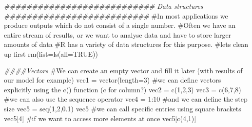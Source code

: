 \documentclass[
  letterpaper,
  DIV=11,
  numbers=noendperiod]{scrreprt}
\newenvironment{Shaded}{\begin{snugshade}}{\end{snugshade}}
\newcommand{\AttributeTok}[1]{\textcolor[rgb]{0.40,0.45,0.13}{#1}}
\newcommand{\CommentTok}[1]{\textcolor[rgb]{0.37,0.37,0.37}{#1}}
\newcommand{\ConstantTok}[1]{\textcolor[rgb]{0.56,0.35,0.01}{#1}}
\newcommand{\DecValTok}[1]{\textcolor[rgb]{0.68,0.00,0.00}{#1}}
\newcommand{\DocumentationTok}[1]{\textcolor[rgb]{0.37,0.37,0.37}{\textit{#1}}}
\newcommand{\FloatTok}[1]{\textcolor[rgb]{0.68,0.00,0.00}{#1}}
\newcommand{\FunctionTok}[1]{\textcolor[rgb]{0.28,0.35,0.67}{#1}}
\newcommand{\NormalTok}[1]{\textcolor[rgb]{0.00,0.23,0.31}{#1}}
\newcommand{\OtherTok}[1]{\textcolor[rgb]{0.00,0.23,0.31}{#1}}
\newcommand{\SpecialCharTok}[1]{\textcolor[rgb]{0.37,0.37,0.37}{#1}}
\begin{document}
\begin{Shaded}
\begin{Highlighting}[]
\DocumentationTok{\#\#\#\#\#\#\#\#\#\#\#\#\#\#\#\#\#\#\#\#\#\#\#\#\#\#\# Data structures \#\#\#\#\#\#\#\#\#\#\#\#\#\#\#\#\#\#\#\#\#\#\#\#\#\#}
\CommentTok{\#In most applications we produce outputs which do not consist of a single number.}
\CommentTok{\#Often we have an entire stream of results, or we want to analyse data and have to store larger amounts of data}
\CommentTok{\#R has a variety of data structures for this purpose.}
\CommentTok{\#let\textquotesingle{}s clean up first}
\FunctionTok{rm}\NormalTok{(}\AttributeTok{list=}\FunctionTok{ls}\NormalTok{(}\AttributeTok{all=}\ConstantTok{TRUE}\NormalTok{))}

\DocumentationTok{\#\#\#\#Vectors }
\CommentTok{\#We can create an empty vector and fill it later (with results of our model for example)}
\NormalTok{vec1 }\OtherTok{=} \FunctionTok{vector}\NormalTok{(}\AttributeTok{length=}\DecValTok{3}\NormalTok{)}
\CommentTok{\#we can define vectors explicitly using the c() function (c for column?)}
\NormalTok{vec2 }\OtherTok{=} \FunctionTok{c}\NormalTok{(}\DecValTok{1}\NormalTok{,}\DecValTok{2}\NormalTok{,}\DecValTok{3}\NormalTok{)}
\NormalTok{vec3 }\OtherTok{=} \FunctionTok{c}\NormalTok{(}\DecValTok{6}\NormalTok{,}\DecValTok{7}\NormalTok{,}\DecValTok{8}\NormalTok{)}
\CommentTok{\#we can also use the sequence operator}
\NormalTok{vec4 }\OtherTok{=} \DecValTok{1}\SpecialCharTok{:}\DecValTok{10}
\CommentTok{\#and we can define the step size}
\NormalTok{vec5 }\OtherTok{=} \FunctionTok{seq}\NormalTok{(}\DecValTok{1}\NormalTok{,}\DecValTok{2}\NormalTok{,}\FloatTok{0.1}\NormalTok{)}
\NormalTok{vec5}
\CommentTok{\#we can call specific entries using square brackets}
\NormalTok{vec5[}\DecValTok{4}\NormalTok{]}
\CommentTok{\#if we want to access more elements at once}
\NormalTok{vec5[}\FunctionTok{c}\NormalTok{(}\DecValTok{4}\NormalTok{,}\DecValTok{1}\NormalTok{)]}


\end{Highlighting}
\end{Shaded}
\end{document}
